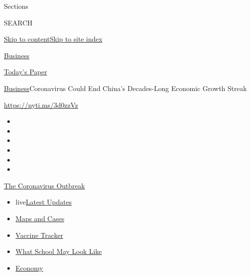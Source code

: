 Sections

SEARCH

\protect\hyperlink{site-content}{Skip to
content}\protect\hyperlink{site-index}{Skip to site index}

\href{https://www.nytimes.com/section/business}{Business}

\href{https://myaccount.nytimes.com/auth/login?response_type=cookie\&client_id=vi}{}

\href{https://www.nytimes.com/section/todayspaper}{Today's Paper}

\href{/section/business}{Business}\textbar{}Coronavirus Could End
China's Decades-Long Economic Growth Streak

\url{https://nyti.ms/3d0zzVz}

\begin{itemize}
\item
\item
\item
\item
\item
\item
\end{itemize}

\href{https://www.nytimes.com/news-event/coronavirus?action=click\&pgtype=Article\&state=default\&region=TOP_BANNER\&context=storylines_menu}{The
Coronavirus Outbreak}

\begin{itemize}
\tightlist
\item
  live\href{https://www.nytimes.com/2020/08/01/world/coronavirus-covid-19.html?action=click\&pgtype=Article\&state=default\&region=TOP_BANNER\&context=storylines_menu}{Latest
  Updates}
\item
  \href{https://www.nytimes.com/interactive/2020/us/coronavirus-us-cases.html?action=click\&pgtype=Article\&state=default\&region=TOP_BANNER\&context=storylines_menu}{Maps
  and Cases}
\item
  \href{https://www.nytimes.com/interactive/2020/science/coronavirus-vaccine-tracker.html?action=click\&pgtype=Article\&state=default\&region=TOP_BANNER\&context=storylines_menu}{Vaccine
  Tracker}
\item
  \href{https://www.nytimes.com/interactive/2020/07/29/us/schools-reopening-coronavirus.html?action=click\&pgtype=Article\&state=default\&region=TOP_BANNER\&context=storylines_menu}{What
  School May Look Like}
\item
  \href{https://www.nytimes.com/live/2020/07/31/business/stock-market-today-coronavirus?action=click\&pgtype=Article\&state=default\&region=TOP_BANNER\&context=storylines_menu}{Economy}
\end{itemize}

